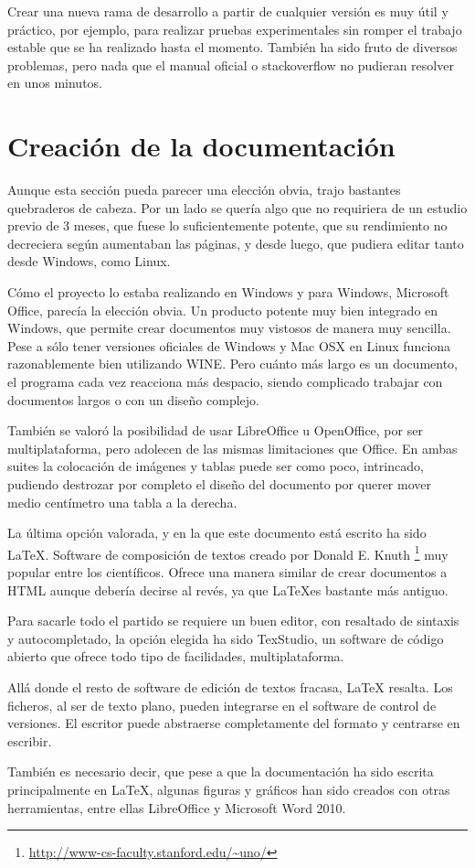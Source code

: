 Crear una nueva rama de desarrollo a partir de cualquier versi\'on es muy \'util y pr\'actico, por ejemplo, para
realizar pruebas experimentales sin romper el trabajo estable que se ha realizado hasta el momento. Tambi\'en
ha sido fruto de diversos problemas, pero nada que el manual oficial o stackoverflow no pudieran
resolver en unos minutos.

\section{Creaci\'{o}n de la documentaci\'{o}n}
Aunque esta secci\'{o}n pueda parecer una elecci\'{o}n obvia, trajo bastantes quebraderos de cabeza. Por un lado
se quer\'{i}a algo que no requiriera
de un estudio previo de 3 meses, que fuese lo suficientemente potente, que su rendimiento no decreciera seg\'{u}n aumentaban las 
p\'{a}ginas, y desde luego,
que pudiera editar tanto desde Windows, como Linux.

C\'{o}mo el proyecto lo estaba realizando en Windows y para Windows, Microsoft Office, parec\'{i}a la elecci\'{o}n obvia. Un 
producto potente muy bien integrado
en Windows, que permite crear documentos muy vistosos de manera muy sencilla. 
Pese a s\'olo tener versiones oficiales de Windows y Mac OSX en Linux
funciona razonablemente bien utilizando WINE. Pero cu\'anto m\'as largo es un documento, el programa cada vez reacciona
m\'as despacio, siendo complicado trabajar con documentos largos o con un dise\~no complejo.

Tambi\'en se valor\'o la posibilidad de usar LibreOffice u OpenOffice, por ser multiplataforma, pero adolecen
de las mismas limitaciones que Office. En ambas suites la colocaci\'on de im\'agenes y tablas puede ser como poco,
intrincado, pudiendo destrozar por completo el dise\~no del documento por querer mover medio cent\'imetro una tabla a la
derecha.

La \'ultima opci\'on valorada, y en la que este documento est\'a escrito ha sido \LaTeX.
Software de composici\'{o}n de textos creado por Donald E. Knuth \footnote{\url{http://www-cs-faculty.stanford.edu/~uno/}} 
muy popular entre los cient\'{i}ficos. Ofrece una manera similar de crear documentos a HTML 
aunque deber\'{i}a decirse al rev\'{e}s, ya que \LaTeX es bastante m\'as antiguo.

Para sacarle todo el partido se requiere un buen editor, con resaltado de sintaxis y autocompletado, 
la opci\'on elegida ha sido TexStudio, un
software de c\'{o}digo abierto que ofrece todo tipo de facilidades, multiplataforma.

All\'a donde el resto de software de edici\'on de textos fracasa, LaTeX resalta. Los ficheros, al ser de texto plano,
pueden integrarse en el software de control de versiones. El escritor puede abstraerse completamente del formato
y centrarse en escribir.

Tambi\'en es necesario decir, que pese a que la documentaci\'on ha sido escrita principalmente en LaTeX, algunas figuras
y gr\'aficos han sido creados con otras herramientas, entre ellas LibreOffice y Microsoft Word 2010.
